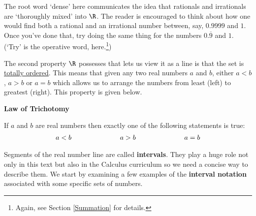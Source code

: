 \medskip

The root word `dense' here communicates the idea that rationals and irrationals are `thoroughly mixed' into $\R$.   The reader is encouraged to think about how one would find both a rational and an irrational number between, say, $0.9999$ and $1$. Once you've done that, try doing the same thing for the numbers $0.\overline{9}$ and $1$. (`Try' is the operative word, here.\footnote{Again, see Section \ref{Summation} for details.})

\smallskip

The second property $\R$ possesses that lets us view it as a line is that the set is \href{http://en.wikipedia.org/wiki/Total_order}{\underline{totally ordered}}. This means that given any two real numbers $a$ and $b$, either $a < b$, $a > b$ or $a = b$ which allows us to arrange the numbers from least (left) to greatest (right). This property is given below.

\medskip

\label{trichotomy}

\colorbox{ResultColor}{\bbm

\centerline{\textbf{Law of Trichotomy}}

If $a$ and $b$ are real numbers then exactly one of the following statements is true: \vspace{-.15in} \[ \begin{array}{lclcl} a < b & \hspace*{0.147\textwidth} & a > b & \hspace*{0.147\textwidth} & a = b \end{array} \]

\ebm}

\medskip

Segments of the real number line are called \textbf{intervals}.  They play a huge role not only in this text but also in the Calculus curriculum so we need a concise way to describe them.  We start by examining a few examples of the \textbf{interval notation} associated with some specific sets of numbers.  

